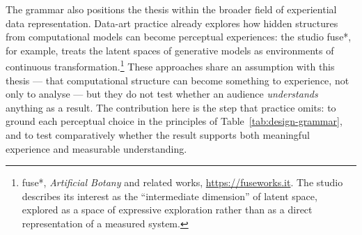 The grammar also positions the thesis within the broader field of experiential data representation. Data-art practice already explores how hidden structures from computational models can become perceptual experiences: the studio fuse*, for example, treats the latent spaces of generative models as environments of continuous transformation.\footnote{fuse*, \emph{Artificial Botany} and related works, \url{https://fuseworks.it}. The studio describes its interest as the ``intermediate dimension'' of latent space, explored as a space of expressive exploration rather than as a direct representation of a measured system.} These approaches share an assumption with this thesis --- that computational structure can become something to experience, not only to analyse --- but they do not test whether an audience \emph{understands} anything as a result. The contribution here is the step that practice omits: to ground each perceptual choice in the principles of Table~\ref{tab:design-grammar}, and to test comparatively whether the result supports both meaningful experience and measurable understanding.



